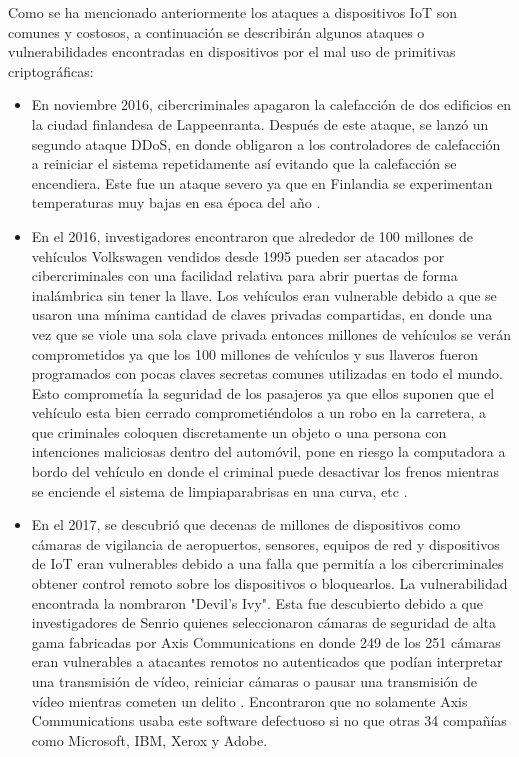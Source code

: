 \documentclass{article}
\begin{document}
            Como se ha mencionado anteriormente los ataques a dispositivos IoT son comunes y costosos, a continuación se describirán algunos ataques o vulnerabilidades encontradas en dispositivos por el mal uso de primitivas criptográficas:

            \begin{itemize}
                \item En noviembre 2016, cibercriminales apagaron la calefacción de dos edificios en la ciudad finlandesa de Lappeenranta. Después de este ataque, se lanzó un segundo ataque DDoS, en donde obligaron a los controladores de calefacción a reiniciar el sistema repetidamente así evitando que la calefacción se encendiera. Este fue un ataque severo ya que en Finlandia se experimentan temperaturas muy bajas en esa época del año \cite{husar_2022}.
                \item En el 2016, investigadores encontraron que alrededor de 100 millones de vehículos Volkswagen vendidos desde 1995 pueden ser atacados por cibercriminales con una facilidad relativa para abrir puertas de forma inalámbrica sin tener la llave. Los vehículos eran vulnerable debido a que se usaron una mínima cantidad de claves privadas compartidas, en donde una vez que se viole una sola clave privada entonces millones de vehículos se verán comprometidos ya que los 100 millones de vehículos y sus llaveros fueron programados con pocas claves secretas comunes utilizadas en todo el mundo. Esto comprometía la seguridad de los pasajeros ya que ellos suponen que el vehículo esta bien cerrado comprometiéndolos a un robo en la carretera, a que criminales coloquen discretamente un objeto o una persona con intenciones maliciosas dentro del automóvil, pone en riesgo la computadora a bordo del vehículo en donde el criminal puede  desactivar los frenos mientras se enciende el sistema de limpiaparabrisas en una curva, etc  \cite{garcia_oswald_kasper_pavlides}.
                \item En el 2017, se descubrió que decenas de millones de dispositivos como cámaras de vigilancia de aeropuertos, sensores, equipos de red y dispositivos de IoT eran vulnerables debido a una falla que permitía a los cibercriminales obtener control remoto sobre los dispositivos o bloquearlos. La vulnerabilidad encontrada la nombraron "Devil's Ivy". Esta fue descubierto debido a que investigadores de Senrio quienes seleccionaron cámaras de seguridad de alta gama fabricadas por Axis Communications en donde 249 de los 251 cámaras eran vulnerables a atacantes remotos no autenticados que podían interpretar una transmisión de vídeo, reiniciar cámaras o pausar una transmisión de vídeo mientras cometen un delito \cite{spring_2019}. Encontraron que no solamente Axis Communications usaba este software defectuoso si no que otras 34 compañías como Microsoft, IBM, Xerox y Adobe.
            \end{itemize}
\end{document}
